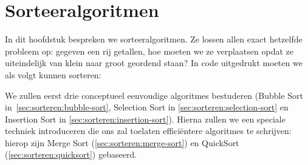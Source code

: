 \chapter{Sorteeralgoritmen}
In dit hoofdstuk bespreken we sorteeralgoritmen. Ze lossen allen exact hetzelfde probleem op:
gegeven een rij getallen, hoe moeten we ze verplaatsen opdat ze uiteindelijk van klein naar groot
geordend staan? In code uitgedrukt moeten we als volgt kunnen sorteren:


We zullen eerst drie conceptueel eenvoudige algoritmes bestuderen (Bubble Sort
in~\cref{sec:sorteren:bubble-sort}, Selection Sort in \cref{sec:sorteren:selection-sort} en Insertion Sort in
\cref{sec:sorteren:insertion-sort}). Hierna zullen we een speciale techniek introduceren
die ons zal toelaten effici\"entere algoritmes te schrijven: hierop zijn Merge Sort
(\cref{sec:sorteren:merge-sort}) en QuickSort (\cref{sec:sorteren:quicksort}) gebaseerd.










